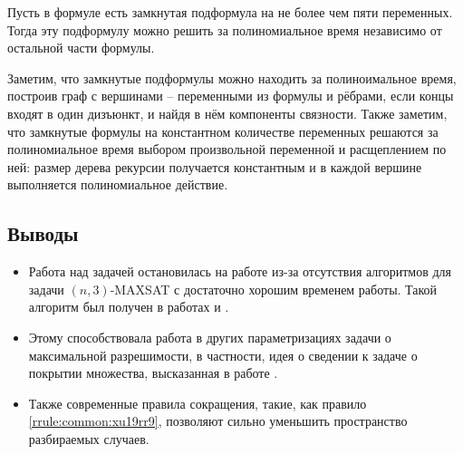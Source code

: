 \begin{rrule}
 Пусть в формуле есть замкнутая подформула на не более чем пяти переменных. Тогда эту подформулу можно решить за полиномиальное время независимо от остальной части формулы.
\end{rrule}

Заметим, что замкнутые подформулы можно находить за полиноимальное время, построив граф с вершинами -- переменными из формулы и рёбрами, если концы входят в один дизъюнкт, и найдя в нём компоненты связности. Также заметим, что замкнутые формулы на константном количестве переменных решаются за полиномиальное время выбором произвольной переменной и расщеплением по ней: размер дерева рекурсии получается константным и в каждой вершине выполняется полиномиальное действие.

\subsection{Выводы}
\label{subsec:literature-review:summary}

\begin{itemize}
 \item Работа над задачей остановилась на работе \cite{bansal99} из-за отсутствия алгоритмов для задачи $(n,3)$-MAXSAT с достаточно хорошим временем работы. Такой алгоритм был получен в работах \cite{li2017improved} и \cite{belova18}.
 \item Этому способствовала работа в других параметризациях задачи о максимальной разрешимости, в частности, идея о сведении к задаче о покрытии множества, высказанная в работе \cite{bliznets12}.
 \item Также современные правила сокращения, такие, как правило \ref{rrule:common:xu19rr9}, позволяют сильно уменьшить пространство разбираемых случаев.
\end{itemize}

